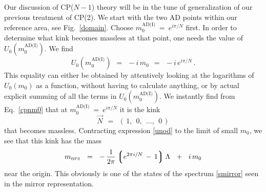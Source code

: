 \documentclass[epsfig,12pt]{article}
\def\beq{\begin{equation}}
\def\eeq{\end{equation}}
\def\beq{\begin{equation}}
\def\eeq{\end{equation}}
\newcommand{\lgr}{\left\lgroup}
\newcommand{\rgr}{\right\rgroup}
\newcommand{\mbps}{m_{\text{\tiny BPS}}}
\newcommand{\W}{\mathcal{W}}
\begin{document}
	Our discussion of CP($N-1$) theory will be in the tune of generalization of our
	previous treatment of CP(2).
	We start with the two AD points within our reference area, see Fig.~\ref{domain}. 
	Choose $ m_0^\text{AD(I)} ~=~ e^{ i \pi / N } $ first.
	In order to determine what kink becomes massless at that point, one needs the value of 
	$ U_0(m_0^\text{AD(I)}) $.
	We find
\beq
\label{cpnm0}
	U_0(m_0^\text{AD(I)}) ~~=~~ -i\, m_0 ~~=~~ -i\, e^{i \pi / N}\,.
\eeq
	This equality can either be obtained by attentively looking at the logarithms of $ U_0(m_0) $ as a function, 
	without having to calculate anything, or by actual explicit summing of all the terms in $ U_0(m_0^\text{AD(I)}) $.
	We instantly find from Eq.~\eqref{cpnm0} that at $ m_0^\text{AD(I)} ~=~ e^{ i \pi / N } $ it is the kink
\beq
\label{ncpn0}
	\vec{N} ~~=~~ (\, 1,~~ 0,~~ ...,~~ 0 \,)
\eeq
	that becomes massless.
	Contracting expression \eqref{unod} to the limit of small $ m_0 $, we see that this kink has the mass
\beq
	\mbps ~~=~~ -\, \frac{1}{2\pi} \lgr e^{2\pi i / N} \,-\, 1 \rgr \Lambda ~~+~~ i\, m_0
\eeq
	near the origin.
	This obviously is one of the states of the spectrum \eqref{smirror} seen in the mirror representation.
\end{document}
